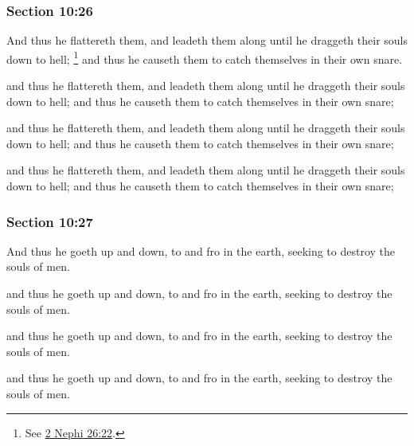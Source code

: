 	\subsubsection{Section 10:26} %
		\label{DC10-26}

		And thus he flattereth them, and leadeth them along until he draggeth their souls down to hell;%
			\footnote{%
				See \hyperref[2NEPHI-26-22]{2 Nephi 26:22}.
				}
		and thus he causeth them to catch themselves in their own snare.

		\begin{framed}
		\scriptsize
			\begin{compactdesc}
				\item[JSP] and thus he flattereth them, and leadeth them along until he draggeth their souls down to hell; and thus he causeth them to catch themselves in their own snare; 
				\item[RB1] [\textit{missing}] 
				\item[DC 1835] and thus he flattereth them, and leadeth them along until he draggeth their souls down to hell; and thus he causeth them to catch themselves in their own snare;
				\item[DC 1844] and thus he flattereth them, and leadeth them along until he draggeth their souls down to hell; and thus he causeth them to catch themselves in their own snare;
			\end{compactdesc}
		\end{framed}

	\subsubsection{Section 10:27} %
		\label{DC10-27}

		And thus he goeth up and down, to and fro in the earth, seeking to destroy the souls of men.

		\begin{framed}
		\scriptsize
			\begin{compactdesc}
				\item[JSP] and thus he goeth up and down, to and fro in the earth, seeking to destroy the souls of men.
				\item[RB1] [\textit{missing}] 
				\item[DC 1835] and thus he goeth up and down, to and fro in the earth, seeking to destroy the souls of men.
				\item[DC 1844] and thus he goeth up and down, to and fro in the earth, seeking to destroy the souls of men.
			\end{compactdesc}
		\end{framed}


